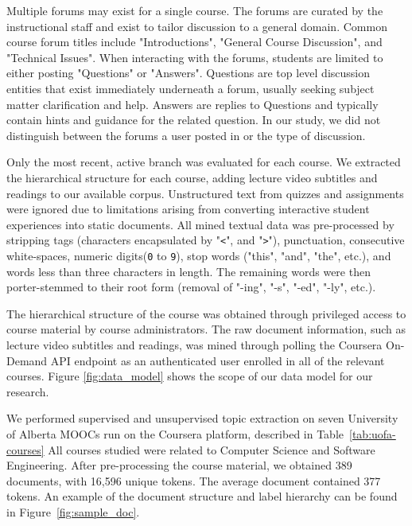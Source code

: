 \documentclass[sigconf, anonymous]{acmart}
\begin{document}
Multiple forums may exist for a single course.
The forums are curated by the instructional staff and exist to tailor discussion to a general domain.
Common course forum titles include "Introductions", "General Course Discussion", and "Technical Issues".
When interacting with the forums, students are limited to either posting "Questions" or "Answers".
Questions are top level discussion entities that exist immediately underneath a forum, usually seeking subject matter clarification and help.
Answers are replies to Questions and typically contain hints and guidance for the related question.
In our study, we did not distinguish between the forums a user posted in or the type of discussion.

Only the most recent, active branch was evaluated for each course.
We extracted the hierarchical structure for each course, adding lecture video subtitles and readings to our available corpus.
Unstructured text from quizzes and assignments were ignored due to limitations arising from converting interactive student experiences into static documents.
All mined textual data was pre-processed by stripping tags (characters encapsulated by "\texttt{<}", and "\texttt{>}"), punctuation, consecutive white-spaces, numeric digits(\texttt{0} to \texttt{9}), stop words ("this", "and", "the", etc.), and words less than three characters in length.
The remaining words were then porter-stemmed to their root form (removal of "-ing", "-s", "-ed", "-ly", etc.).

The hierarchical structure of the course was obtained through privileged access to course material by course administrators.
The raw document information, such as lecture video subtitles and readings, was mined through polling the Coursera On-Demand API endpoint as an authenticated user enrolled in all of the relevant courses.
Figure \ref{fig:data_model} shows the scope of our data model for our research.

We performed supervised and unsupervised topic extraction on seven University of Alberta MOOCs run on the Coursera platform, described in Table~\ref{tab:uofa-courses}
All courses studied were related to Computer Science and Software Engineering.
After pre-processing the course material, we obtained 389 documents, with 16,596 unique tokens. %
The average document contained 377 tokens.
An example of the document structure and label hierarchy can be found in Figure~\ref{fig:sample_doc}.
\end{document}
